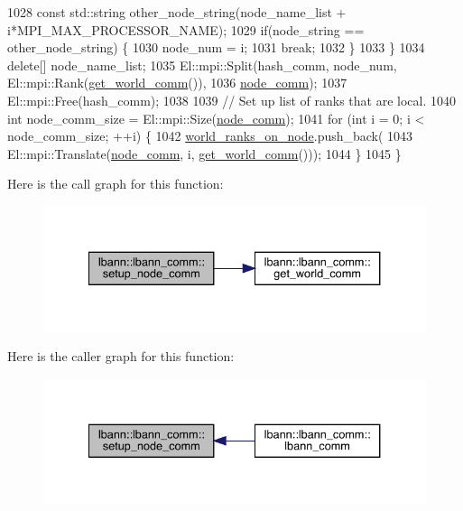 \begin{DoxyCode}
1028     \textcolor{keyword}{const} std::string other\_node\_string(node\_name\_list + i*MPI\_MAX\_PROCESSOR\_NAME);
1029     \textcolor{keywordflow}{if}(node\_string == other\_node\_string) \{
1030       node\_num = i;
1031       \textcolor{keywordflow}{break};
1032     \}
1033   \}
1034   \textcolor{keyword}{delete}[] node\_name\_list;
1035   El::mpi::Split(hash\_comm, node\_num, El::mpi::Rank(\hyperlink{classlbann_1_1lbann__comm_a0493f1f0c42b95674daacf5288fdb073}{get\_world\_comm}()),
1036                  \hyperlink{classlbann_1_1lbann__comm_a8aeb530ae4cedfa4d1141bb9c4704e6c}{node\_comm});
1037   El::mpi::Free(hash\_comm);
1038 
1039   \textcolor{comment}{// Set up list of ranks that are local.}
1040   \textcolor{keywordtype}{int} node\_comm\_size = El::mpi::Size(\hyperlink{classlbann_1_1lbann__comm_a8aeb530ae4cedfa4d1141bb9c4704e6c}{node\_comm});
1041   \textcolor{keywordflow}{for} (\textcolor{keywordtype}{int} i = 0; i < node\_comm\_size; ++i) \{
1042     \hyperlink{classlbann_1_1lbann__comm_a3299a37fe7b0eae43a5c154148ab6dc2}{world\_ranks\_on\_node}.push\_back(
1043       El::mpi::Translate(\hyperlink{classlbann_1_1lbann__comm_a8aeb530ae4cedfa4d1141bb9c4704e6c}{node\_comm}, i, \hyperlink{classlbann_1_1lbann__comm_a0493f1f0c42b95674daacf5288fdb073}{get\_world\_comm}()));
1044   \}
1045 \}
\end{DoxyCode}
Here is the call graph for this function\+:\nopagebreak
\begin{figure}[H]
\begin{center}
\leavevmode
\includegraphics[width=334pt]{classlbann_1_1lbann__comm_a44bc6b8683f04c2a3fc2f01fc734a946_cgraph}
\end{center}
\end{figure}
Here is the caller graph for this function\+:\nopagebreak
\begin{figure}[H]
\begin{center}
\leavevmode
\includegraphics[width=334pt]{classlbann_1_1lbann__comm_a44bc6b8683f04c2a3fc2f01fc734a946_icgraph}
\end{center}
\end{figure}
\mbox{\label{classlbann_1_1lbann__comm_a597189b10f61947580f97fb8d1da7355}} 

